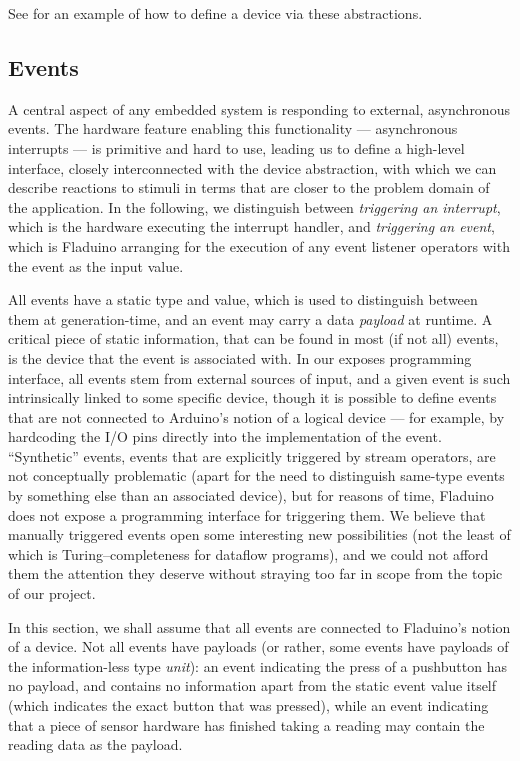 \documentclass[a4paper, oneside, final]{memoir}
\let\Fref\undefined
\begin{document}
See \Fref{sec:pushbuttondef} for an example of how to define a device
via these abstractions.

\subsection{Events}
\label{sec:events_design}
A central aspect of any embedded system is responding to external,
asynchronous events.  The hardware feature enabling this functionality
--- asynchronous interrupts --- is primitive and hard to use, leading
us to define a high-level interface, closely interconnected with the
device abstraction, with which we can describe reactions to stimuli in
terms that are closer to the problem domain of the application.  In
the following, we distinguish between \textit{triggering an
  interrupt}, which is the hardware executing the interrupt handler,
and \textit{triggering an event}, which is Fladuino arranging for the
execution of any event listener operators with the event as the input
value.

All events have a static type and value, which is used to distinguish
between them at generation-time, and an event may carry a data
\textit{payload} at runtime.  A critical piece of static information,
that can be found in most (if not all) events, is the device that the
event is associated with.  In our exposes programming interface, all
events stem from external sources of input, and a given event is such
intrinsically linked to some specific device, though it is possible to
define events that are not connected to Arduino's notion of a logical
device --- for example, by hardcoding the I/O pins directly into the
implementation of the event.  ``Synthetic'' events, events that are
explicitly triggered by stream operators, are not conceptually
problematic (apart for the need to distinguish same-type events by
something else than an associated device), but for reasons of time,
Fladuino does not expose a programming interface for triggering them.
We believe that manually triggered events open some interesting new
possibilities (not the least of which is Turing--completeness for
dataflow programs), and we could not afford them the attention they
deserve without straying too far in scope from the topic of our
project.

In this section, we shall assume that all events are connected to
Fladuino's notion of a device.  Not all events have payloads (or
rather, some events have payloads of the information-less type
\textit{unit}): an event indicating the press of a pushbutton has no
payload, and contains no information apart from the static event value
itself (which indicates the exact button that was pressed), while an
event indicating that a piece of sensor hardware has finished taking a
reading may contain the reading data as the payload.
\end{document}
